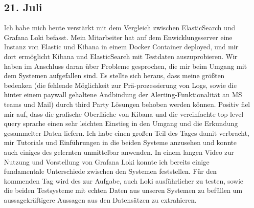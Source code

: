 \subsection{21. Juli}
Ich habe mich heute verstärkt mit dem Vergleich zwischen ElasticSearch und Grafana Loki befasst. Mein Mitarbeiter hat auf dem Enwicklungsserver eine Instanz von Elastic und Kibana in einem Docker Container deployed, und mir dort ermöglicht Kibana und ElasticSearch mit Testdaten auszuprobieren. Wir haben im Anschluss daran über Probleme gesprochen, die mir beim Umgang mit dem Systemen aufgefallen sind. Es stellte sich heraus, dass meine größten bedenken (die fehlende Möglichkeit zur Prä-prozessierung von Logs, sowie die hinter einem paywall gehaltene Andbindung der Alerting-Funktionalität an MS teams und Mail) durch third Party Lösungen behoben werden können. Positiv fiel mir auf, dass die grafische Oberfläche von Kibana und die vereinfachte top-level query sprache einen sehr leichten Einstieg in den Umgang und die Erkundung gesammelter Daten liefern. Ich habe einen großen Teil des Tages damit verbracht, mir Tutorials und Einführungen in die beiden Systeme anzusehen und konnte auch einiges des gelernten unmittelbar anwenden.
In einem langen Video zur Nutzung und Vorstellung von Grafana Loki konnte ich bereits einige fundamentale Unterschiede zwischen den Systemen feststellen. Für den kommenden Tag wird des zur Aufgabe, auch Loki ausführlicher zu testen, sowie die beiden Testsysteme mit echten Daten aus unseren Systemen zu befüllen um aussagekräftigere Aussagen aus den Datensätzen zu extrahieren.